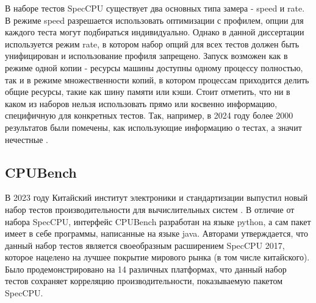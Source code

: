 В наборе тестов SpecCPU существует два основных типа замера - speed и rate. В режиме speed разрешается использовать оптимизации с профилем, опции для каждого теста могут подбираться индивидуально. Однако в данной диссертации используется режим rate, в котором набор опций для всех тестов должен быть унифицирован и использование профиля запрещено. Запуск возможен как в режиме  одной копии - ресурсы машины доступны одному процессу полностью, так и  в режиме множественности копий, в котором процессам приходится делить общие ресурсы, такие как шину памяти или кэши. Стоит отметить, что ни в каком из наборов нельзя использовать прямо или косвенно информацию, специфичную для конкретных тестов. Так, например, в 2024 году более 2000 результатов  были помечены, как использующие информацию о тестах, а значит нечестные \cite{cliffFlagged}.

\subsection{CPUBench}\label{p1:tests:cpubench}

В 2023 году Китайский институт электроники и стандартизации выпустил новый набор тестов производительности для вычислительных систем \cite{lu2023cpubench}. В отличие от набора SpecCPU, интерфейс CPUBench разработан на языке python, а сам пакет имеет в себе программы, написанные на языке java. Авторами утверждается, что данный набор тестов является своеобразным расширением SpecCPU 2017, которое нацелено на лучшее покрытие мирового рынка (в том числе китайского). Было продемонстрировано на 14 различных платформах, что данный набор тестов сохраняет корреляцию производительности, показываемую пакетом SpecCPU.

